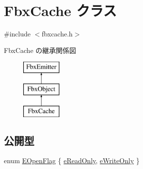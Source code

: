\hypertarget{class_fbx_cache}{}\section{Fbx\+Cache クラス}
\label{class_fbx_cache}


{\ttfamily \#include $<$fbxcache.\+h$>$}

Fbx\+Cache の継承関係図\begin{figure}[H]
\begin{center}
\leavevmode
\includegraphics[height=3.000000cm]{class_fbx_cache}
\end{center}
\end{figure}
\subsection*{公開型}
\begin{DoxyCompactItemize}
\item 
enum \hyperlink{class_fbx_cache_a92f455159736ec2cdc0c282af9dbd139}{E\+Open\+Flag} \{ \hyperlink{class_fbx_cache_a92f455159736ec2cdc0c282af9dbd139acfeade2d8bab8a3b915f8064991cc007}{e\+Read\+Only}, 
\hyperlink{class_fbx_cache_a92f455159736ec2cdc0c282af9dbd139af48325666196336ed9c672386686ef63}{e\+Write\+Only}
 \}
\end{DoxyCompactItemize}
